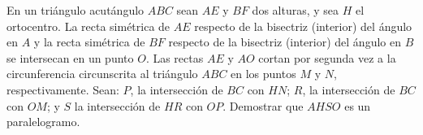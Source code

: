 En un triángulo acutángulo $ABC$ sean $AE$ y $BF$ dos alturas, y sea $H$ el ortocentro. La recta simétrica de $AE$ respecto de la bisectriz (interior) del ángulo en $A$ y la recta simétrica de $BF$ respecto de la bisectriz (interior) del ángulo en $B$ se intersecan en un punto $O$. Las rectas $AE$ y $AO$ cortan por segunda vez a la circunferencia circunscrita al triángulo $ABC$ en los puntos $M$ y $N$, respectivamente. \newline 
Sean: $P$, la intersección de $BC$ con $HN$; $R$, la intersección de $BC$ con $OM$; y $S$ la intersección de $HR$ con $OP$. \newline 
Demostrar que $AHSO$ es un paralelogramo.
